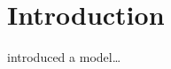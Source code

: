 \documentclass{article}
\begin{document}
{
    \section{Introduction}
    \label{sec:introduction}

    \cite{sr} introduced a model…




}
\end{document}
